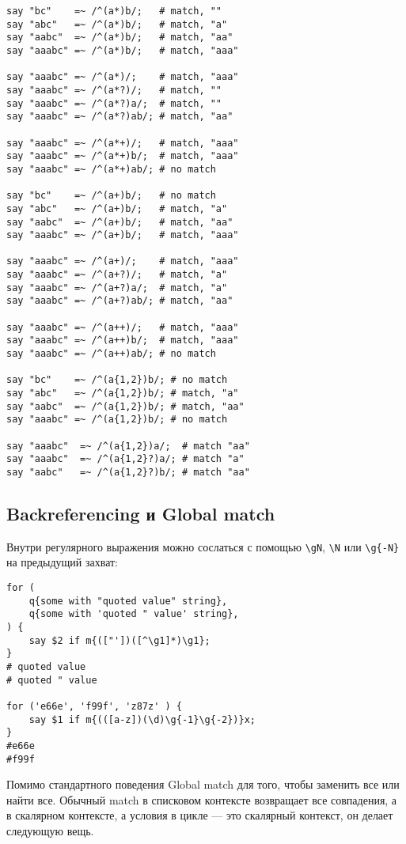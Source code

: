 \begin{verbatim}
say "bc"    =~ /^(a*)b/;   # match, ""
say "abc"   =~ /^(a*)b/;   # match, "a"
say "aabc"  =~ /^(a*)b/;   # match, "aa"
say "aaabc" =~ /^(a*)b/;   # match, "aaa"

say "aaabc" =~ /^(a*)/;    # match, "aaa"
say "aaabc" =~ /^(a*?)/;   # match, ""
say "aaabc" =~ /^(a*?)a/;  # match, ""
say "aaabc" =~ /^(a*?)ab/; # match, "aa"

say "aaabc" =~ /^(a*+)/;   # match, "aaa"
say "aaabc" =~ /^(a*+)b/;  # match, "aaa"
say "aaabc" =~ /^(a*+)ab/; # no match

say "bc"    =~ /^(a+)b/;   # no match
say "abc"   =~ /^(a+)b/;   # match, "a"
say "aabc"  =~ /^(a+)b/;   # match, "aa"
say "aaabc" =~ /^(a+)b/;   # match, "aaa"

say "aaabc" =~ /^(a+)/;    # match, "aaa"
say "aaabc" =~ /^(a+?)/;   # match, "a"
say "aaabc" =~ /^(a+?)a/;  # match, "a"
say "aaabc" =~ /^(a+?)ab/; # match, "aa"

say "aaabc" =~ /^(a++)/;   # match, "aaa"
say "aaabc" =~ /^(a++)b/;  # match, "aaa"
say "aaabc" =~ /^(a++)ab/; # no match

say "bc"    =~ /^(a{1,2})b/; # no match
say "abc"   =~ /^(a{1,2})b/; # match, "a"
say "aabc"  =~ /^(a{1,2})b/; # match, "aa"
say "aaabc" =~ /^(a{1,2})b/; # no match

say "aaabc"  =~ /^(a{1,2})a/;  # match "aa"
say "aaabc"  =~ /^(a{1,2}?)a/; # match "a"
say "aabc"   =~ /^(a{1,2}?)b/; # match "aa"
\end{verbatim}

\subsection{Backreferencing и Global match}
Внутри регулярного выражения можно сослаться с помощью \verb|\gN|, \verb|\N| или \verb|\g{-N}| на предыдущий захват:
\begin{verbatim}
for (
    q{some with "quoted value" string},
    q{some with 'quoted " value' string},
) {
    say $2 if m{(["'])([^\g1]*)\g1};
}
# quoted value
# quoted " value

for ('e66e', 'f99f', 'z87z' ) {
    say $1 if m{(([a-z])(\d)\g{-1}\g{-2})}x;
}
#e66e
#f99f
\end{verbatim}

Помимо стандартного поведения Global match для того, чтобы заменить все или найти все. Обычный match в списковом контексте возвращает все совпадения, а в скалярном контексте, а условия в цикле --- это скалярный контекст, он делает следующую вещь.

